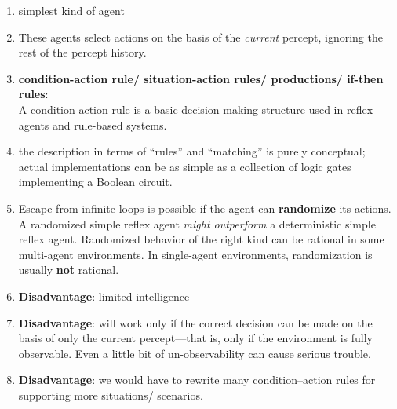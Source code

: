 \begin{enumerate}[itemsep=0.2cm]
    \item simplest kind of agent
    \hfill \cite{ai/book/Artificial-Intelligence-A-Modern-Approach/Russell-Norvig}

    \item These agents select actions on the basis of the \textit{current} percept, ignoring the rest of the percept history.
    \hfill \cite{ai/book/Artificial-Intelligence-A-Modern-Approach/Russell-Norvig}

    \item \textbf{condition-action rule/ situation-action rules/ productions/ if-then rules}:\\
    A condition-action rule is a basic decision-making structure used in reflex agents and rule-based systems.
    \hfill \cite{ai/book/Artificial-Intelligence-A-Modern-Approach/Russell-Norvig, common/online/chatgpt}

    \item the description in terms of “rules” and “matching” is purely conceptual; actual implementations can be as simple as a collection of logic gates implementing a Boolean circuit.
    \hfill \cite{ai/book/Artificial-Intelligence-A-Modern-Approach/Russell-Norvig}

    \item Escape from infinite loops is possible if the agent can \textbf{randomize} its actions.  
    A randomized simple reflex agent \textit{might outperform} a deterministic simple reflex agent.
    Randomized behavior of the right kind can be rational in some multi-agent environments. 
    In single-agent environments, randomization is usually \textbf{not} rational. 
    \hfill \cite{ai/book/Artificial-Intelligence-A-Modern-Approach/Russell-Norvig}
    

    \item \textbf{Disadvantage}: limited intelligence
    \hfill \cite{ai/book/Artificial-Intelligence-A-Modern-Approach/Russell-Norvig}

    \item \textbf{Disadvantage}: will work only if the correct decision can be made on the basis of only the current percept—that is, only if the environment is fully observable. Even a little bit of un-observability can cause serious trouble.
    \hfill \cite{ai/book/Artificial-Intelligence-A-Modern-Approach/Russell-Norvig}

    \item \textbf{Disadvantage}: we would have to rewrite many condition–action rules for supporting more situations/ scenarios. 

\end{enumerate}


